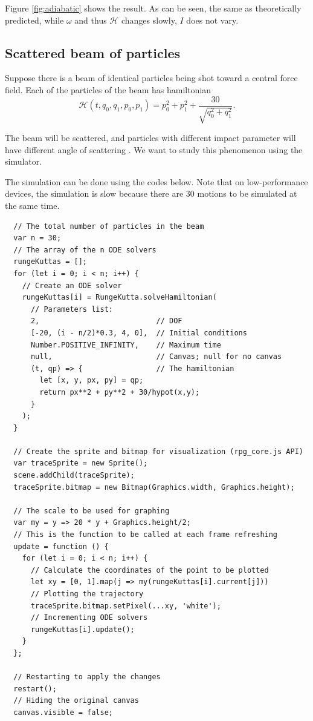 \documentclass[12pt]{article}
\begin{document}
Figure \ref{fig:adiabatic} shows the result.
As can be seen, the same as theoretically predicted,
while $\omega$ and thus $\mathcal H$ changes slowly, $I$ does not vary.

\subsection{Scattered beam of particles}

Suppose there is a beam of identical particles being shot toward a central force field.
Each of the particles of the beam has hamiltonian
\begin{equation*}
  \mathcal H\!\left(t,q_0,q_1,p_0,p_1\right)=p_0^2+p_1^2+\frac{30}{\sqrt{q_0^2+q_1^2}}.
\end{equation*}

The beam will be scattered, and particles with different impact parameter will
have different angle of scattering \cite[p. 49]{landau1976mechanics}.
We want to study this phenomenon using the simulator.

The simulation can be done using the codes below.
Note that on low-performance devices, the simulation is slow
because there are 30 motions to be simulated at the same time.

\begin{verbatim}
  // The total number of particles in the beam
  var n = 30;
  // The array of the n ODE solvers
  rungeKuttas = [];
  for (let i = 0; i < n; i++) {
    // Create an ODE solver
    rungeKuttas[i] = RungeKutta.solveHamiltonian(
      // Parameters list:
      2,                           // DOF
      [-20, (i - n/2)*0.3, 4, 0],  // Initial conditions
      Number.POSITIVE_INFINITY,    // Maximum time
      null,                        // Canvas; null for no canvas
      (t, qp) => {                 // The hamiltonian
        let [x, y, px, py] = qp;
        return px**2 + py**2 + 30/hypot(x,y);
      }
    );
  }

  // Create the sprite and bitmap for visualization (rpg_core.js API)
  var traceSprite = new Sprite();
  scene.addChild(traceSprite);
  traceSprite.bitmap = new Bitmap(Graphics.width, Graphics.height);

  // The scale to be used for graphing
  var my = y => 20 * y + Graphics.height/2;
  // This is the function to be called at each frame refreshing
  update = function () {
    for (let i = 0; i < n; i++) {
      // Calculate the coordinates of the point to be plotted
      let xy = [0, 1].map(j => my(rungeKuttas[i].current[j]))
      // Plotting the trajectory
      traceSprite.bitmap.setPixel(...xy, 'white');
      // Incrementing ODE solvers
      rungeKuttas[i].update();
    }
  };

  // Restarting to apply the changes
  restart();
  // Hiding the original canvas
  canvas.visible = false;
\end{verbatim}
\end{document}
